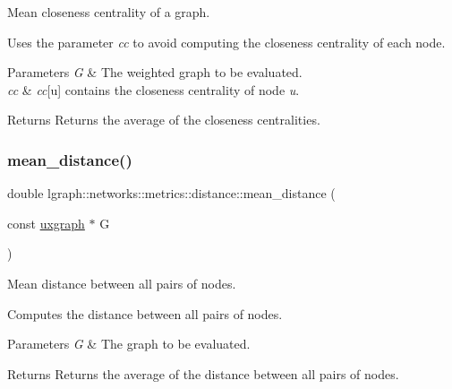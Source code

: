 Mean closeness centrality of a graph. 

Uses the parameter {\itshape cc} to avoid computing the closeness centrality of each node.


\begin{DoxyParams}{Parameters}
{\em G} & The weighted graph to be evaluated. \\
\hline
{\em cc} & {\itshape cc}\mbox{[}u\mbox{]} contains the closeness centrality of node {\itshape u}. \\
\hline
\end{DoxyParams}
\begin{DoxyReturn}{Returns}
Returns the average of the closeness centralities. 
\end{DoxyReturn}
\mbox{\label{namespacelgraph_1_1networks_1_1metrics_1_1distance_ae0989fe3a9841ab45e373f00e4c7f4e0}} 
\subsubsection{\texorpdfstring{mean\+\_\+distance()}{mean\_distance()}\hspace{0.1cm}{\footnotesize\ttfamily [1/4]}}
{\footnotesize\ttfamily double lgraph\+::networks\+::metrics\+::distance\+::mean\+\_\+distance (\begin{DoxyParamCaption}\item[{const \hyperlink{classlgraph_1_1uxgraph}{uxgraph} $\ast$}]{G }\end{DoxyParamCaption})}



Mean distance between all pairs of nodes. 

Computes the distance between all pairs of nodes.


\begin{DoxyParams}{Parameters}
{\em G} & The graph to be evaluated. \\
\hline
\end{DoxyParams}
\begin{DoxyReturn}{Returns}
Returns the average of the distance between all pairs of nodes. 
\end{DoxyReturn}
\mbox{\label{namespacelgraph_1_1networks_1_1metrics_1_1distance_a17eab7f8ea3692a6f531219ebd567a2f}} 
